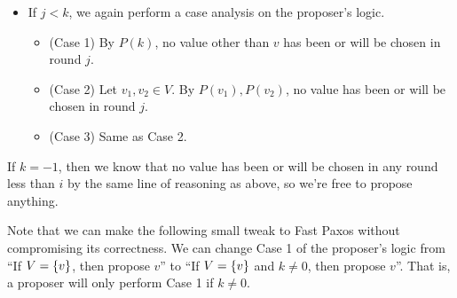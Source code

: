 \documentclass{mwhittaker}
\theoremstyle{definition}
\begin{document}
\begin{appendices}
\begin{itemize}
  \item
    If $j < k$, we again perform a case analysis on the proposer's logic.
    \begin{itemize}
      \item
        (Case 1) By $P(k)$, no value other than $v$ has been or will be chosen
        in round $j$.
      \item
        (Case 2) Let $v_1, v_2 \in V$. By $P(v_1), P(v_2)$, no value has been
        or will be chosen in round $j$.
      \item
        (Case 3) Same as Case 2.
    \end{itemize}
\end{itemize}
If $k = -1$, then we know that no value has been or will be chosen in any round
less than $i$ by the same line of reasoning as above, so we're free to propose
anything.

Note that we can make the following small tweak to Fast Paxos without
compromising its correctness. We can change Case 1 of the proposer's logic from
``If $V = \{v\}$, then propose $v$'' to ``If $V = \{v\}$ and $k \neq 0$,
then propose $v$''. That is, a proposer will only perform Case 1 if $k \neq 0$.

\end{appendices}
\end{document}
